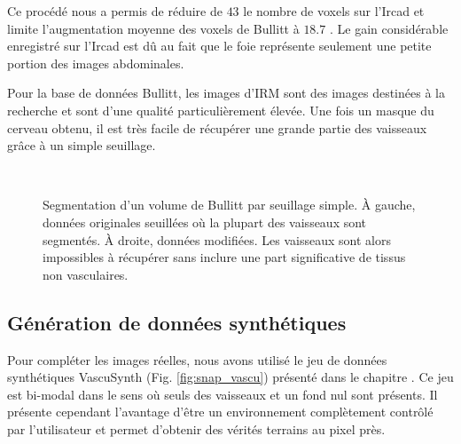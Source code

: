 Ce procédé nous a permis de réduire de $43$ \percent{}le nombre de voxels sur l'Ircad et limite l'augmentation moyenne des voxels de Bullitt à $18.7$ \percent. Le gain considérable enregistré sur l'Ircad est dû au fait que le foie représente seulement une petite portion des images abdominales.

Pour la base de données Bullitt, les images d'IRM sont des images destinées à la recherche et sont d'une qualité particulièrement élevée. Une fois un masque du cerveau obtenu, il est très facile de récupérer une grande partie des vaisseaux grâce à un simple seuillage. 

\begin{figure}[!ht]
  \centering
   \\
  \caption{Segmentation d'un volume de Bullitt par seuillage simple. À gauche, données originales seuillées où la plupart des vaisseaux sont segmentés. À droite, données modifiées. Les vaisseaux sont alors impossibles à récupérer sans inclure une part significative de tissus non vasculaires.}
  \label{fig:modifications_bullitt}
\end{figure}

\subsection{Génération de données synthétiques}

Pour compléter les images réelles, nous avons utilisé le jeu de données synthétiques VascuSynth (Fig. \ref{fig:snap_vascu}) présenté dans le chapitre \chapContext{}. Ce jeu est bi-modal dans le sens où seuls des vaisseaux et un fond nul sont présents. Il présente cependant l'avantage d'être un environnement complètement contrôlé par l'utilisateur et permet d'obtenir des vérités terrains au pixel près. 


